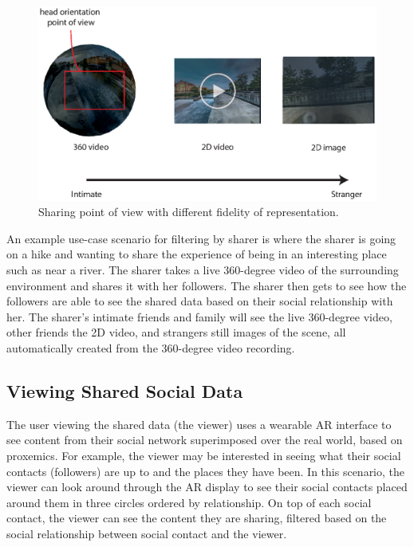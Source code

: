 \begin{figure}[H]
    \centering
    \includegraphics[width=.8\linewidth]{images/chi/images2.0-09.eps}
    \caption{Sharing point of view with different fidelity of representation.}
    \label{fig:data:sharer}
\end{figure}

An example use-case scenario for filtering by sharer is where the sharer is going on a hike and wanting to share the experience of being in an interesting place such as near a river. The sharer takes a live 360-degree video of the surrounding environment and shares it with her followers. The sharer then gets to see how the followers are able to see the shared data based on their social relationship with her. The sharer's intimate friends and family will see the live 360-degree video, other friends the 2D video, and strangers still images of the scene, all automatically created from the 360-degree video recording.

\subsection{Viewing Shared Social Data}

The user viewing the shared data (the viewer) uses a wearable AR interface to see content from their social network superimposed over the real world, based on proxemics. For example, the viewer may be interested in seeing what their social contacts (followers) are up to and the places they have been. In this scenario, the viewer can look around through the AR display to see their social contacts placed around them in three circles ordered by relationship. On top of each social contact, the viewer can see the content they are sharing, filtered based on the social relationship between social contact and the viewer.

